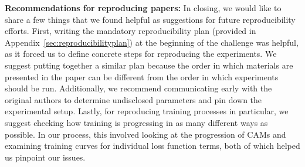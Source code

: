 \textbf{Recommendations for reproducing papers:} In closing, we would like to share a few things that we found helpful as suggestions for future reproducibility efforts. First, writing the mandatory reproducibility plan (provided in Appendix~\ref{sec:reproducibilityplan}) at the beginning of the challenge was helpful, as it forced us to define concrete steps for reproducing the experiments. We suggest putting together a similar plan because the order in which materials are presented in the paper can be different from the order in which experiments should be run. Additionally, we recommend communicating early with the original authors to determine undisclosed parameters and pin down the experimental setup. Lastly, for reproducing training processes in particular, we suggest checking how training is progressing in as many different ways as possible. In our process, this involved looking at the progression of CAMs and examining training curves for individual loss function terms, both of which helped us pinpoint our issues.